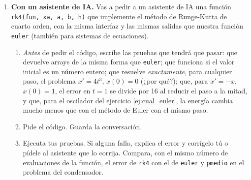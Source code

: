 \begin{enumerate}
\item \label{ej:rk4_ia} \textbf{Con un asistente de IA.} Vas a pedir a un asistente de IA una función \texttt{rk4(fun, xa, a, b, h)} que implemente el método de Runge-Kutta de cuarto orden, con la misma interfaz y las mismas salidas que nuestra función \texttt{euler} (también para sistemas de ecuaciones).
\begin{enumerate}
\item \emph{Antes} de pedir el código, escribe las pruebas que tendrá que pasar: que devuelve arrays de la misma forma que \texttt{euler}; que funciona si el valor inicial es un número entero; que resuelve \emph{exactamente}, para cualquier paso, el problema $x'=4t^3$, $x(0)=0$ (¿por qué?); que, para $x'=-x$, $x(0)=1$, el error en $t=1$ se divide por 16 al reducir el paso a la mitad, y que, para el oscilador del ejercicio \ref{ej:cual_euler}, la energía cambia mucho menos que con el método de Euler con el mismo paso.
\item Pide el código. Guarda la conversación.
\item Ejecuta tus pruebas. Si alguna falla, explica el error y corrígelo tú o pídele al asistente que lo corrija. Compara, con el mismo número de evaluaciones de la función, el error de \texttt{rk4} con el de \texttt{euler} y \texttt{pmedio} en el problema del condensador.
\end{enumerate}
\end{enumerate}

